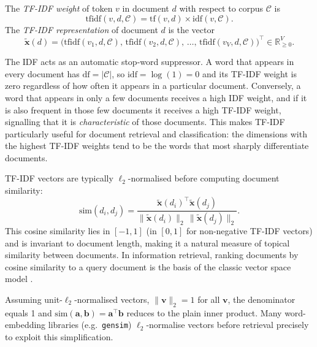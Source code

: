 \begin{deepdive}
\begin{definition}
\label{def:tfidf}
The \emph{TF-IDF weight} of token $v$ in document $d$ with respect to corpus
$\mathcal{C}$ is
\begin{equation}
\label{eq:tfidf}
  \mathrm{tfidf}(v, d, \mathcal{C}) = \mathrm{tf}(v, d) \times \mathrm{idf}(v, \mathcal{C}).
\end{equation}
The \emph{TF-IDF representation} of document $d$ is the vector
\[
  \tilde{\mathbf{x}}(d) = \bigl(\mathrm{tfidf}(v_1, d, \mathcal{C}),\,
                                 \mathrm{tfidf}(v_2, d, \mathcal{C}),\, \ldots,\,
                                 \mathrm{tfidf}(v_V, d, \mathcal{C})\bigr)^\top
  \in \mathbb{R}_{\geq 0}^V.
\]
\end{definition}

The IDF acts as an automatic stop-word suppressor.  A word that appears in every
document has $\mathrm{df} = |\mathcal{C}|$, so $\mathrm{idf} = \log(1) = 0$ and its
TF-IDF weight is zero regardless of how often it appears in a particular document.
Conversely, a word that appears in only a few documents receives a high IDF weight,
and if it is also frequent in those few documents it receives a high TF-IDF weight,
signalling that it is \emph{characteristic} of those documents.  This makes TF-IDF
particularly useful for document retrieval and classification: the dimensions with the
highest TF-IDF weights tend to be the words that most sharply differentiate documents.

TF-IDF vectors are typically $\ell_2$-normalised before computing document similarity:
\begin{equation}
\label{eq:cosine-sim}
  \mathrm{sim}(d_i, d_j) = \frac{\tilde{\mathbf{x}}(d_i)^\top \tilde{\mathbf{x}}(d_j)}
                                 {\|\tilde{\mathbf{x}}(d_i)\|_2\, \|\tilde{\mathbf{x}}(d_j)\|_2}.
\end{equation}
This cosine similarity lies in $[-1, 1]$ (in $[0,1]$ for non-negative TF-IDF vectors)
and is invariant to document length, making it a natural measure of topical similarity
between documents.  In information retrieval, ranking documents by cosine similarity to
a query document is the basis of the classic vector space model
\cite{salton1975vector}. %

\begin{remark}
\label{rem:unit-norm-cosine}
Assuming unit-$\ell_2$-normalised vectors, $\|\mathbf{v}\|_2 = 1$ for all
$\mathbf{v}$, the denominator equals 1 and
$\mathrm{sim}(\mathbf{a}, \mathbf{b}) = \mathbf{a}^{\top}\mathbf{b}$ reduces to
the plain inner product.  Many word-embedding libraries (e.g.\
\texttt{gensim}) $\ell_2$-normalise vectors before retrieval precisely to
exploit this simplification.
\end{remark}


\end{deepdive}
